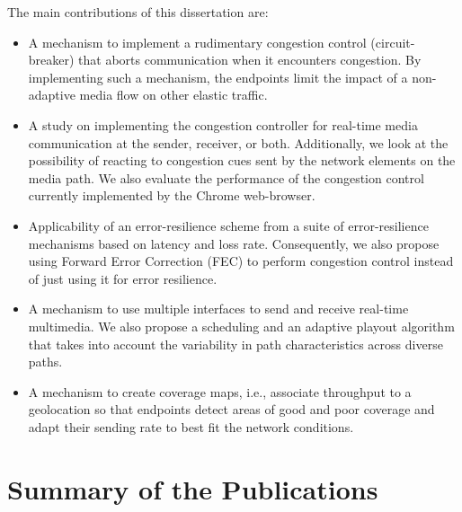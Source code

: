 The main contributions of this dissertation are:

\begin{itemize}
\setlength{\itemsep}{0pt}


\item A mechanism to implement a rudimentary congestion control (circuit-breaker)
that aborts communication when it encounters congestion. By
implementing such a mechanism, the endpoints limit the impact of a non-adaptive
media flow on other elastic traffic.

\item A study on implementing the congestion controller for real-time media
communication at the sender, receiver, or both. Additionally, we look at the
possibility of reacting to congestion cues sent by the network elements on the
media path. We also evaluate the performance of the congestion control
currently implemented by the Chrome web-browser.

\item Applicability of an error-resilience scheme from a suite of
error-resilience mechanisms based on latency and loss rate. Consequently, we
also propose using Forward Error Correction (FEC) to perform congestion
control instead of just using it for error resilience.

\item A mechanism to use multiple interfaces to send and receive real-time
multimedia. We also propose a scheduling and an adaptive playout algorithm
that takes into account the variability in path characteristics across diverse
paths.

\item A mechanism to create coverage maps, i.e., associate throughput to a
geolocation so that endpoints detect areas of good and poor coverage and
adapt their sending rate to best fit the network conditions.

\end{itemize}

\section{Summary of the Publications}

